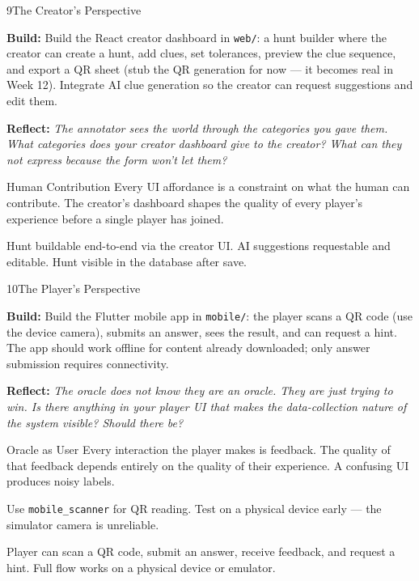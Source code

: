 \documentclass[
  11pt,
  oneside,
  DIV=12,
]{scrartcl}
\newcommand{\build}[1]{\textbf{\color{SpringMoss}Build:} #1}
\newcommand{\reflect}[1]{\textbf{\color{ConceptBlue}Reflect:} \textit{#1}}
\begin{document}
\begin{milestone}{9}{The Creator's Perspective}

\build{Build the React creator dashboard in \texttt{web/}:
a hunt builder where the creator can create a hunt, add clues, set
tolerances, preview the clue sequence, and export a QR sheet (stub the QR
generation for now — it becomes real in Week 12). Integrate AI clue
generation so the creator can request suggestions and edit them.}

\medskip
\reflect{The annotator sees the world through the categories you gave them.
What categories does your creator dashboard give to the creator?
What can they not express because the form won't let them?}

\begin{hitlconcept}{Human Contribution}
  Every UI affordance is a constraint on what the human can contribute.
  The creator's dashboard shapes the quality of every player's experience
  before a single player has joined.
\end{hitlconcept}

\begin{checkpoint}
  Hunt buildable end-to-end via the creator UI. AI suggestions requestable
  and editable. Hunt visible in the database after save.
\end{checkpoint}

\end{milestone}

\begin{milestone}{10}{The Player's Perspective}

\build{Build the Flutter mobile app in \texttt{mobile/}:
the player scans a QR code (use the device camera), submits an answer,
sees the result, and can request a hint. The app should work offline for
content already downloaded; only answer submission requires connectivity.}

\medskip
\reflect{The oracle does not know they are an oracle. They are just trying
to win. Is there anything in your player UI that makes the data-collection
nature of the system visible? Should there be?}

\begin{hitlconcept}{Oracle as User}
  Every interaction the player makes is feedback. The quality of that
  feedback depends entirely on the quality of their experience. A confusing
  UI produces noisy labels.
\end{hitlconcept}

\begin{hintbox}
  Use \texttt{mobile\_scanner} for QR reading. Test on a physical device
  early — the simulator camera is unreliable.
\end{hintbox}

\begin{checkpoint}
  Player can scan a QR code, submit an answer, receive feedback, and
  request a hint. Full flow works on a physical device or emulator.
\end{checkpoint}

\end{milestone}
\end{document}
